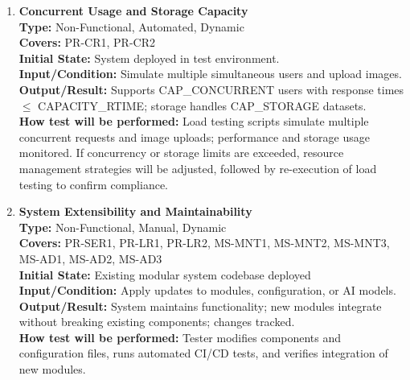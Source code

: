 \documentclass[12pt, titlepage]{article}
\begin{document}
\begin{enumerate}[label=NFR-ST \arabic*., wide=0pt, leftmargin=*]
  \item \textbf{Concurrent Usage and Storage Capacity} \\[2mm]
    \textbf{Type:} Non-Functional, Automated, Dynamic \\
    \textbf{Covers:} PR-CR1, PR-CR2 \\
    \textbf{Initial State:} System deployed in test environment. \\
    \textbf{Input/Condition:} Simulate multiple simultaneous users
    and upload images. \\
    \textbf{Output/Result:} Supports CAP\_CONCURRENT users with
    response times $\le$ CAPACITY\_RTIME; storage handles CAP\_STORAGE datasets. \\[2mm]
    \textbf{How test will be performed:} Load testing scripts
    simulate multiple concurrent requests and image uploads;
    performance and storage usage monitored. If concurrency or storage limits are exceeded, 
    resource management strategies will be adjusted, 
    followed by re-execution of load testing to confirm compliance.

  \item \textbf{System Extensibility and Maintainability} \\[2mm]
    \textbf{Type:} Non-Functional, Manual, Dynamic \\
    \textbf{Covers:} PR-SER1, PR-LR1, PR-LR2, MS-MNT1, MS-MNT2,
    MS-MNT3, MS-AD1, MS-AD2, MS-AD3 \\
    \textbf{Initial State:} Existing modular system codebase deployed \\
    \textbf{Input/Condition:} Apply updates to modules,
    configuration, or AI models. \\
    \textbf{Output/Result:} System maintains functionality; new
    modules integrate without breaking existing components; changes
    tracked. \\[2mm]
    \textbf{How test will be performed:} Tester modifies components
    and configuration files, runs automated CI/CD tests, and verifies
    integration of new modules.


\end{enumerate}
\end{document}
